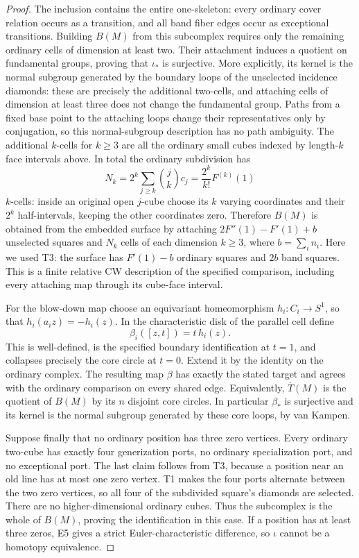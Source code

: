 \documentclass[11pt,a4paper]{article}
\begin{document}
\begin{proof}
The inclusion contains the entire one-skeleton: every ordinary cover
relation occurs as a transition, and all band fiber edges occur as
exceptional transitions. Building $B(M)$ from this subcomplex requires
only the remaining ordinary cells of dimension at least two. Their
attachment induces a quotient on fundamental groups, proving that
$\iota_*$ is surjective. More explicitly, its kernel is the normal
subgroup generated by the boundary loops of the unselected incidence
diamonds: these are precisely the additional two-cells, and attaching
cells of dimension at least three does not change the fundamental group.
Paths from a fixed base point to the attaching loops change their
representatives only by conjugation, so this normal-subgroup description
has no path ambiguity. The additional $k$-cells for $k\geq3$ are all the
ordinary small cubes indexed by length-$k$ face intervals above. In total
the ordinary subdivision has
\[
 N_k=2^k\sum_{j\geq k}\binom jk c_j
     =\frac{2^k}{k!}F^{(k)}(1)
\]
$k$-cells: inside an original open $j$-cube choose its $k$ varying
coordinates and their $2^k$ half-intervals, keeping the other coordinates
zero. Therefore $B(M)$ is obtained from the embedded surface by attaching
$2F''(1)-F'(1)+b$ unselected squares and $N_k$ cells of each dimension
$k\geq3$, where $b=\sum_i n_i$. Here we used T3: the surface has
$F'(1)-b$ ordinary squares and $2b$ band squares. This is a finite
relative CW description of the specified comparison, including every
attaching map through its cube-face interval.

For the blow-down map choose an equivariant
homeomorphism $h_i:C_i\to S^1$, so that
$h_i(a_i z)=-h_i(z)$. In the characteristic disk of the parallel cell
define
\[
 \beta_i([z,t])=t\,h_i(z).
\]
This is well-defined, is the specified boundary identification at
$t=1$, and collapses precisely the core circle at $t=0$. Extend it by
the identity on the ordinary complex. The resulting map $\beta$ has
exactly the stated target and agrees with the ordinary comparison on
every shared edge. Equivalently, $\overline T(M)$ is the quotient of
$B(M)$ by its $n$ disjoint core circles. In particular $\beta_*$ is
surjective and its kernel is the normal subgroup generated by these
core loops, by van Kampen.

Suppose finally that no ordinary position has three zero vertices.
Every ordinary two-cube has exactly four generization ports, no
ordinary specialization port, and no exceptional port. The last claim
follows from T3, because a position near an old line has at most one
zero vertex. T1 makes the four ports alternate between the two zero
vertices, so all four of the subdivided square's diamonds are selected.
There are no higher-dimensional ordinary cubes. Thus the subcomplex
is the whole of $B(M)$, proving the identification in this case. If a
position has at least three zeros, E5 gives a strict Euler-characteristic
difference, so $\iota$ cannot be a homotopy equivalence.


\end{proof}
\end{document}
